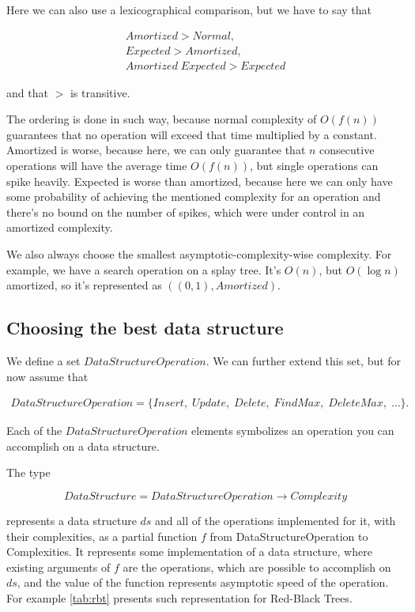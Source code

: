 \documentclass[a4paper,11pt]{article}
\begin{document}
		Here we can also use a lexicographical comparison, but we have to say that

		\begin{eqnarray}
			Amortized > Normal,\\
			Expected > Amortized,\\
			Amortized \; Expected > Expected
		\end{eqnarray}

		and that $>$ is transitive.

		The ordering is done in such way, because normal complexity of $O(f(n))$ guarantees that no operation
		will exceed that time multiplied by a constant. Amortized is worse, because here, we can only guarantee
		that $n$ consecutive operations will have the average time $O(f(n))$, but single operations can spike
		heavily. Expected is worse than amortized, because here we can only have some probability of achieving
		the mentioned complexity for an operation and there's no bound on the number of spikes, which were under
		control in an amortized complexity.

		We also always choose the smallest asymptotic-complexity-wise complexity.  For example, we have a search
		operation on a splay tree. It's $O(n)$, but $O(\log n)$ amortized, so it's represented as
		$((0,1),Amortized)$.

	\subsection{Choosing the best data structure} \label{sec:choose-ds}

		We define a set $DataStructureOperation$. We can further extend this set, but for now assume that

		\begin{eqnarray}
			DataStructureOperation = \{Insert, \; Update, \; Delete, \; FindMax,\; DeleteMax, \; \dots\}.
		\end{eqnarray}

		Each of the $DataStructureOperation$ elements symbolizes an operation you can accomplish on a data
		structure.

		The type

		\begin{equation}\label{data-structure-type}
			DataStructure = DataStructureOperation \rightarrow Complexity
		\end{equation}

		represents a data structure $ds$ and all of the operations implemented for it, with their complexities, as a
		partial function $f$ from DataStructureOperation to Complexities. It represents some implementation of a
		data structure, where existing arguments of $f$ are the operations, which are possible to accomplish on
		$ds$, and the value of the function represents asymptotic speed of the operation. For example
		\autoref{tab:rbt} presents such representation for Red-Black Trees.
\end{document}
